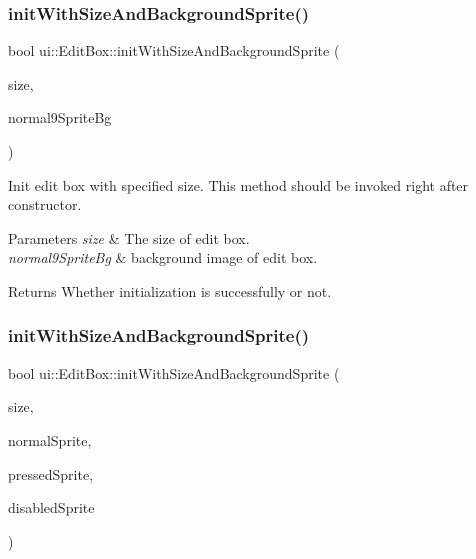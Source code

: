 \subsubsection{\texorpdfstring{init\+With\+Size\+And\+Background\+Sprite()}{initWithSizeAndBackgroundSprite()}\hspace{0.1cm}{\footnotesize\ttfamily [4/5]}}
{\footnotesize\ttfamily bool ui\+::\+Edit\+Box\+::init\+With\+Size\+And\+Background\+Sprite (\begin{DoxyParamCaption}\item[{const \hyperlink{classSize}{Size} \&}]{size,  }\item[{\hyperlink{classui_1_1Scale9Sprite}{Scale9\+Sprite} $\ast$}]{normal9\+Sprite\+Bg }\end{DoxyParamCaption})}

Init edit box with specified size. This method should be invoked right after constructor. 
\begin{DoxyParams}{Parameters}
{\em size} & The size of edit box. \\
\hline
{\em normal9\+Sprite\+Bg} & background image of edit box. \\
\hline
\end{DoxyParams}
\begin{DoxyReturn}{Returns}
Whether initialization is successfully or not. 
\end{DoxyReturn}
\mbox{\label{classui_1_1EditBox_a200998adef67726af687f61da2a928f2}} 
\subsubsection{\texorpdfstring{init\+With\+Size\+And\+Background\+Sprite()}{initWithSizeAndBackgroundSprite()}\hspace{0.1cm}{\footnotesize\ttfamily [5/5]}}
{\footnotesize\ttfamily bool ui\+::\+Edit\+Box\+::init\+With\+Size\+And\+Background\+Sprite (\begin{DoxyParamCaption}\item[{const \hyperlink{classSize}{Size} \&}]{size,  }\item[{\hyperlink{classui_1_1Scale9Sprite}{Scale9\+Sprite} $\ast$}]{normal\+Sprite,  }\item[{\hyperlink{classui_1_1Scale9Sprite}{Scale9\+Sprite} $\ast$}]{pressed\+Sprite,  }\item[{\hyperlink{classui_1_1Scale9Sprite}{Scale9\+Sprite} $\ast$}]{disabled\+Sprite }\end{DoxyParamCaption})}

